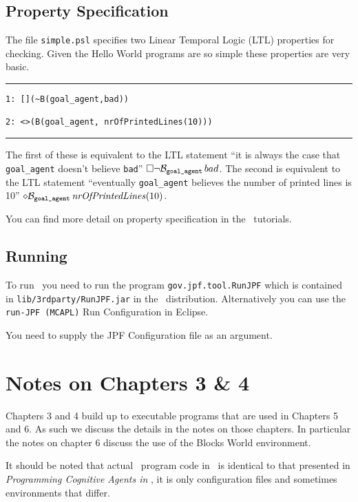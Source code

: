 \subsection{Property Specification}
The file \texttt{simple.psl} specifies two Linear Temporal Logic (LTL) properties for checking.  Given the Hello World programs are so simple these properties are very basic.  

\noindent\rule{\textwidth}{1pt}
\begin{small}
\begin{verbatim}
1: [](~B(goal_agent,bad))

2: <>(B(goal_agent, nrOfPrintedLines(10)))
\end{verbatim}
\end{small}
\rule{\textwidth}{1pt}

The first of these is equivalent to the LTL statement ``it is always the case that \texttt{goal\_agent} doesn't believe \texttt{bad}'' $\Box \neg \mathrm{{\cal B}}_{\texttt{goal\_agent}} \, bad$.  The second is equivalent to the LTL statement ``eventually \texttt{goal\_agent} believes the number of printed lines is 10'' $\diamond \mathrm{{\cal B}}_{\texttt{goal\_agent}} \, \mathit{nrOfPrintedLines}(10)$.

You can find more detail on property specification in the \ajpf\ tutorials.

\subsection{Running \ajpf}
To run \ajpf\ you need to run the program \texttt{gov.jpf.tool.RunJPF} which is contained in \texttt{lib/3rdparty/RunJPF.jar} in the \mcapl\ distribution.  Alternatively you can use the \texttt{run-JPF (MCAPL)} Run Configuration in Eclipse.

You need to supply the JPF Configuration file as an argument.  

\section{Notes on Chapters 3 \& 4}

Chapters 3 and 4 build up to executable programs that are used in Chapters 5 and 6.  As such we discuss the details in the notes on those chapters.  In particular the notes on chapter 6 discuss the use of the Blocks World environment.

It should be noted that actual \goal\ program code in \ail\ is identical to that presented in \emph{Programming Cognitive Agents in \goal}, it is only configuration files and sometimes environments that differ.

